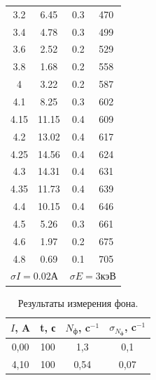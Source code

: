 \documentclass[a4paper, 12pt]{article}
\begin{document}
\begin{table}[h]
\begin{tabular}{c|c|c|c}
        3.2                  & 6.45                   & 0.3                      & 470               \\
        3.4                  & 4.78                   & 0.3                      & 499               \\
        3.6                  & 2.52                   & 0.2                      & 529               \\
        3.8                  & 1.68                   & 0.2                      & 558               \\
        4                    & 3.22                   & 0.2                      & 587               \\
        4.1                  & 8.25                   & 0.3                      & 602               \\
        4.15                 & 11.15                  & 0.4                      & 609               \\
        4.2                  & 13.02                  & 0.4                      & 617               \\
        4.25                 & 14.56                  & 0.4                      & 624               \\
        4.3                  & 14.31                  & 0.4                      & 631               \\
        4.35                 & 11.73                  & 0.4                      & 639               \\
        4.4                  & 10.15                  & 0.4                      & 646               \\
        4.5                  & 5.26                   & 0.3                      & 661               \\
        4.6                  & 1.97                   & 0.2                      & 675               \\
        4.8                  & 0.69                   & 0.1                      & 705               \\
        \multicolumn{2}{l}{$\sigma I = 0.02\text{А}$} & \multicolumn{2}{l}{$\sigma E = 3\text{кэВ}$}
        \end{tabular}
        \end{table}
		
		\begin{table}[h]
		    \centering
			\caption{Результаты измерения фона.}
			\label{table:exp2}
			\begin{tabular}{|c|c|c|c|}
				\hline
				$I$, A & t, с & $N_\text{ф}$, c$^{-1}$ & $\sigma_{N_\text{ф}}$, c$^{-1}$ \\ \hline
				0,00   & 100  & 1,3                    & 0,1                             \\ \hline
				4,10   & 100  & 0,54                   & 0,07                            \\ \hline
			\end{tabular}
		\end{table}
	
\end{document}

